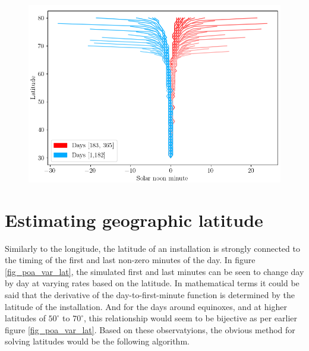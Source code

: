 \begin{figure}[]
\centering
\includegraphics[width=1\linewidth]{pics/solarnoontimes2}
\label{fig_solarnoontimes}
\end{figure}








\newpage 
\section{Estimating geographic latitude}
Similarly to the longitude, the latitude of an installation is strongly connected to the timing of the first and last non-zero minutes of the day. In figure \ref{fig_poa_var_lat}, the simulated first and last minutes can be seen to change day by day at varying rates based on the latitude. In mathematical terms it could be said that the derivative of the day-to-first-minute function is determined by the latitude of the installation. And for the days around equinoxes, and at higher latitudes of $50^\circ$ to $70^\circ$, this relationship would seem to be bijective as per earlier figure \ref{fig_poa_var_lat}. Based on these observatyions, the obvious method for solving latitudes would be the following algorithm. \hfill


